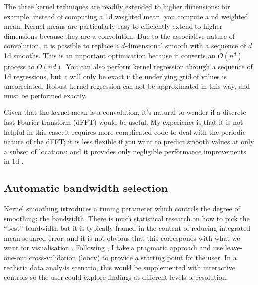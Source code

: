 \documentclass[journal]{vgtc}                %
\begin{document}
The three kernel techniques are readily extended to higher dimensions: for example, instead of computing a 1d weighted mean, you compute a nd weighted mean. Kernel means are particularly easy to efficiently extend to higher dimensions  because they are a convolution. Due to the associative nature of convolution, it is possible to replace a $d$-dimensional smooth with a sequence of $d$ 1d smooths. This is an important optimisation because it converts an $O(n^d)$ process to $O(nd)$. You can also perform kernel regression through a sequence of 1d regressions, but it will only be exact if the underlying grid of values is uncorrelated. Robust kernel regression can not be approximated in this way, and must be performed exactly.

Given that the kernel mean is a convolution, it's natural to wonder if a discrete fast Fourier transform (dFFT) would be useful. My experience is that it is not helpful in this case: it requires more complicated code to deal with the periodic nature of the dFFT; it is less flexible if you want to predict smooth values at only a subset of locations; and it provides only negligible performance improvements in 1d \citep{wand:1994}.

% 

\subsection{Automatic bandwidth selection}

Kernel smoothing introduces a tuning parameter which controls the degree of smoothing: the bandwidth. There is much statistical research on how to pick the ``best'' bandwidth but it is typically framed in the content of reducing integrated mean squared error, and it is not obvious that this corresponds with what we want for visualisation \citep{denby:2009}. Following \citep{loader:1999}, I take a pragmatic approach and use leave-one-out cross-validation ({\sc loocv}) \citep{efron:1983} to provide a starting point for the user. In a realistic data analysis scenario, this would be supplemented with interactive controls so the user could explore findings at different levels of resolution.
\end{document}
